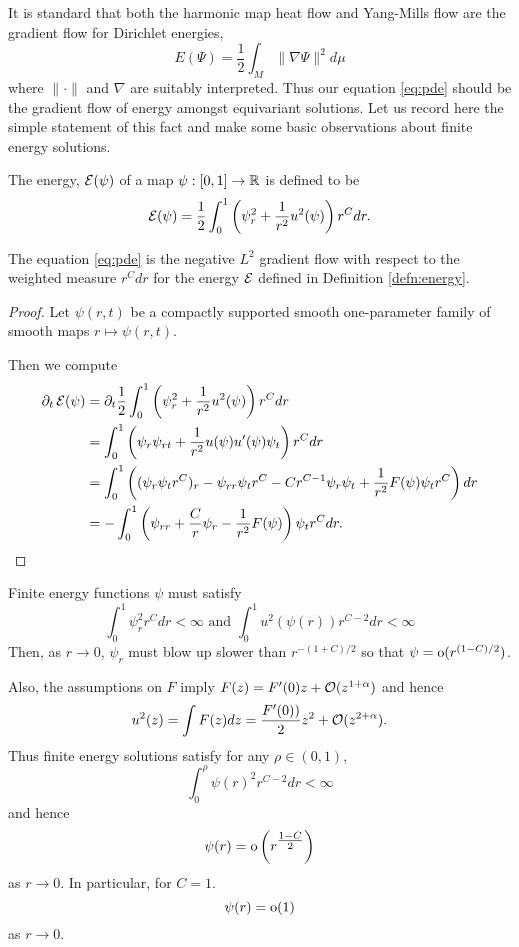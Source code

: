\documentclass{amsart}
\begin{document}
It is standard that both the harmonic map heat flow and Yang-Mills flow are the gradient flow for Dirichlet energies,
\[
E(\Psi) = \frac{1}{2} \int_M \|\nabla \Psi\|^2 d\mu
\]
where \(\|\cdot\|\) and \(\nabla\) are suitably interpreted. Thus our equation \eqref{eq:pde} should be the gradient flow of energy amongst equivariant solutions. Let us record here the simple statement of this fact and make some basic observations about finite energy solutions.

\begin{defn}
\label{defn:energy}
The energy, \(\operatorname{\mathcal{E}}(\psi)\) of a map \(\psi: [0, 1] \to \mathbb{R}\) is defined to be
\[
\operatorname{\mathcal{E}}(\psi) = \frac{1}{2} \int_0^1 \left(\psi_r^2 + \frac{1}{r^2} u^2(\psi)\right) r^C dr.
\]
\end{defn}

\begin{lemma}
The equation \eqref{eq:pde} is the negative \(L^2\) gradient flow with respect to the weighted measure \(r^C dr\) for the energy \(\operatorname{\mathcal{E}}\) defined in Definition \ref{defn:energy}.
\end{lemma}

\begin{proof}
Let \(\psi(r, t)\) be a compactly supported smooth one-parameter family of smooth maps \(r \mapsto \psi(r, t)\).

Then we compute
\[
\begin{split}
\partial_t \operatorname{\mathcal{E}}(\psi) &= \partial_t \frac{1}{2} \int_0^1  \left(\psi_r^2 + \frac{1}{r^2} u^2(\psi)\right) r^C dr \\
&= \int_0^1  \left(\psi_r \psi_{rt} + \frac{1}{r^2} u(\psi)u'(\psi) \psi_t \right) r^C dr \\
&= \int_0^1 \left((\psi_r \psi_t r^C)_r - \psi_{rr} \psi_t r^C - C r^{C-1} \psi_r \psi_t + \frac{1}{r^2} F(\psi) \psi_t r^C\right) dr \\
&= - \int_0^1 \left(\psi_{rr} + \frac{C}{r} \psi_r - \frac{1}{r^2} F(\psi)\right) \psi_t r^C dr.
\end{split}
\]
\end{proof}

\begin{rem}
\label{rem:finite_energy}

Finite energy functions \(\psi\) must satisfy
\[
\int_0^1 \psi_r^2 r^C dr < \infty \text{ and } \int_0^1 u^2(\psi(r)) r^{C-2} dr < \infty
\]
Then, as \(r\to 0\), \(\psi_r\) must blow up slower than \(r^{-(1+C)/2}\) so that \(\psi = \operatorname{o}(r^{(1-C)/2})\).

Also, the assumptions on \(F\) imply \(F(z) = F'(0) z + \operatorname{\mathcal{O}}(z^{1+\alpha})\) and hence
\[
u^2(z) = \int F(z) dz = \frac{F'(0))}{2} z^2 + \operatorname{\mathcal{O}}(z^{2+\alpha}).
\]
Thus finite energy solutions satisfy for any \(\rho \in (0, 1)\),
\[
\int_0^{\rho} \psi(r)^2 r^{C-2} dr < \infty
\]
and hence
\[
\psi(r) = \operatorname{o}\left(r^{\tfrac{1-C}{2}}\right)
\]
as \(r \to 0\). In particular, for \(C = 1\).
\[
\psi(r) = \operatorname{o}(1)
\]
as \(r \to 0\).
\end{rem}
\end{document}
